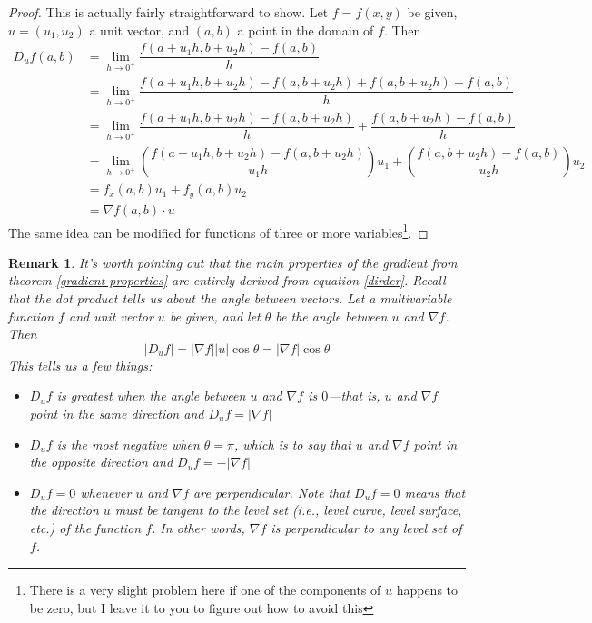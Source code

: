 \documentclass[12pt]{article}
\numberwithin{equation}{subsection}
\numberwithin{figure}{subsection}
\theoremstyle{note}
\newtheorem{remark}[subsection]{Remark}
\begin{document}
{\begin{proof}
This is actually fairly straightforward to show. Let $f=f(x,y)$ be given, $u=(u_1,u_2)$ a unit vector, and $(a,b)$ a point in the domain of $f$. Then \begin{align*} D_u f(a,b)&=\lim_{h\to0^+} \dfrac{f(a+u_1 h, b+u_2 h)- f(a,b)}{h} \\ 
&= \lim_{h\to 0^+} \dfrac{ f(a+u_1 h, b+u_2 h)- f(a, b+u_2 h) + f(a,b+u_2 h) - f(a,b)}{h} \\
&=\lim_{h\to 0^+} \dfrac{ f(a+u_1 h, b+u_2 h)- f(a, b+u_2 h)}{h} +  \dfrac{ f(a, b+u_2 h)- f(a, b)}{h} \\
&=\lim_{h\to 0^+} \left( \dfrac{ f(a+u_1 h, b+u_2 h)- f(a, b+u_2 h)}{u_1 h}\right) u_1 +  \left( \dfrac{ f(a, b+u_2 h)- f(a, b)}{u_2 h}\right) u_2 \\
&=f_x(a,b) u_1+f_y(a,b) u_2 \\
&= \nabla f (a,b) \cdot u\end{align*} 
The same idea can be modified for functions of three or more variables\footnote{There is a very slight problem here if one of the components of $u$ happens to be zero, but I leave it to you to figure out how to avoid this}.
\end{proof}



\begin{remark}
	It's worth pointing out that the main properties of the gradient from theorem \ref{gradient-properties} are entirely derived from equation \eqref{dirder}. Recall that the dot product tells us about the angle between vectors. Let a multivariable function $f$ and unit vector $u$ be given, and let $\theta$ be the angle between $u$ and $\nabla f$. Then \begin{equation} |D_u f| = |\nabla f| |u| \cos \theta=|\nabla f | \cos \theta\end{equation}
	This tells us a few things: \begin{itemize}
		\item $D_u f$ is greatest when the angle between $u$ and $\nabla f$ is $0$---that is, $u$ and $\nabla f$ point in the same direction and $D_u f=|\nabla f|$
		\item $D_u f$ is the \textit{most negative} when $\theta=\pi$, which is to say that $u$ and $\nabla f$ point in the opposite direction and $D_uf=-|\nabla f|$
		\item $D_u f=0$ whenever $u$ and $\nabla f$ are perpendicular. Note that $D_u f=0$ means that the direction $u$ must be tangent to the level set (i.e., level curve, level surface, etc.) of the function $f$. In other words, $\nabla f$ is perpendicular to any level set of $f$. 
	\end{itemize}


\end{remark}}
\end{document}
